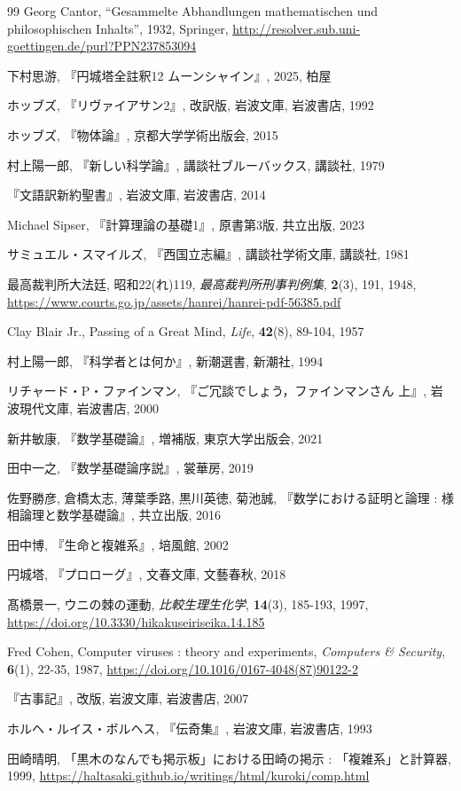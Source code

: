 \documentclass[10pt, a5paper, twoside]{ltjsarticle}
\begin{document}
\begin{thebibliography}{99}
         Georg Cantor, ``Gesammelte Abhandlungen mathematischen und philosophischen Inhalts'', 1932, Springer, \url{http://resolver.sub.uni-goettingen.de/purl?PPN237853094}

         下村思游, 『円城塔全註釈12 ムーンシャイン』, 2025, 柏屋

         ホッブズ, 『リヴァイアサン2』, 改訳版, 岩波文庫, 岩波書店, 1992

         ホッブズ, 『物体論』, 京都大学学術出版会, 2015

         村上陽一郎, 『新しい科学論』, 講談社ブルーバックス, 講談社, 1979

         『文語訳新約聖書』, 岩波文庫, 岩波書店, 2014

         Michael Sipser, 『計算理論の基礎1』, 原書第3版, 共立出版, 2023

         サミュエル・スマイルズ, 『西国立志編』, 講談社学術文庫, 講談社, 1981

         最高裁判所大法廷, 昭和22(れ)119, \textit{最高裁判所刑事判例集}, \textbf{2}(3), 191, 1948, \url{https://www.courts.go.jp/assets/hanrei/hanrei-pdf-56385.pdf}

         Clay Blair Jr., Passing of a Great Mind, \textit{Life}, \textbf{42}(8), 89-104, 1957

         村上陽一郎, 『科学者とは何か』, 新潮選書, 新潮社, 1994

         リチャード・P・ファインマン, 『ご冗談でしょう，ファインマンさん 上』, 岩波現代文庫, 岩波書店, 2000

         新井敏康, 『数学基礎論』, 増補版, 東京大学出版会, 2021

         田中一之, 『数学基礎論序説』, 裳華房, 2019

         佐野勝彦, 倉橋太志, 薄葉季路, 黒川英徳, 菊池誠, 『数学における証明と論理 : 様相論理と数学基礎論』, 共立出版, 2016

         田中博, 『生命と複雑系』, 培風館, 2002

         円城塔, 『プロローグ』, 文春文庫, 文藝春秋, 2018

         髙橋景一, ウニの棘の運動, \textit{比較生理生化学}, \textbf{14}(3), 185-193, 1997, \url{https://doi.org/10.3330/hikakuseiriseika.14.185}

         Fred Cohen, Computer viruses : theory and experiments, \textit{Computers \& Security}, \textbf{6}(1), 22-35, 1987, \url{https://doi.org/10.1016/0167-4048(87)90122-2}

         『古事記』, 改版, 岩波文庫, 岩波書店, 2007

         ホルヘ・ルイス・ボルヘス, 『伝奇集』, 岩波文庫, 岩波書店, 1993

         田崎晴明, 「黒木のなんでも掲示板」における田崎の掲示 : 「複雑系」と計算器, 1999, \url{https://haltasaki.github.io/writings/html/kuroki/comp.html}

    \end{thebibliography}
\end{document}
